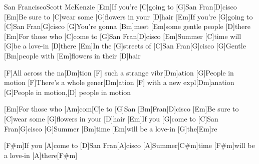 \documentclass[../main.tex]{subfiles}
\begin{document}
\begin{song}{San Francisco}{Scott McKenzie}{}
[Em]If you're [C]going to [G]San Fran[D]cisco
[Em]Be sure to [C]wear some [G]flowers in your [D]hair
[Em]If you're [G]going to [C]San Fran[G]cisco
[G]You're gonna [Bm]meet [Em]some gentle people [D]there
[Em]For those who [C]come to [G]San Fran[D]cisco
[Em]Summer [C]time will [G]be a love-in [D]there
[Em]In the [G]streets of [C]San Fran[G]cisco
[G]Gentle [Bm]people with [Em]flowers in their [D]hair

[F]All across the na[Dm]tion [F]   such a strange vibr[Dm]ation
[G]People in motion
[F]There's a whole gener[Dm]ation  [F]  with a new expl[Dm]anation
[G]People in motion,[D] people in motion

[Em]For those who [Am]com[C]e to [G]San [Bm]Fran[D]cisco
[Em]Be sure to [C]wear some [G]flowers in your [D]hair
[Em]If you [G]come to [C]San Fran[G]cisco
[G]Summer [Bm]time [Em]will be a love-in [G]the[Em]re

[F#m]If you [A]come to [D]San Fran[A]cisco
[A]Summer[C#m]time [F#m]will be a love-in [A]there[F#m]

\end{song}
\end{document}
